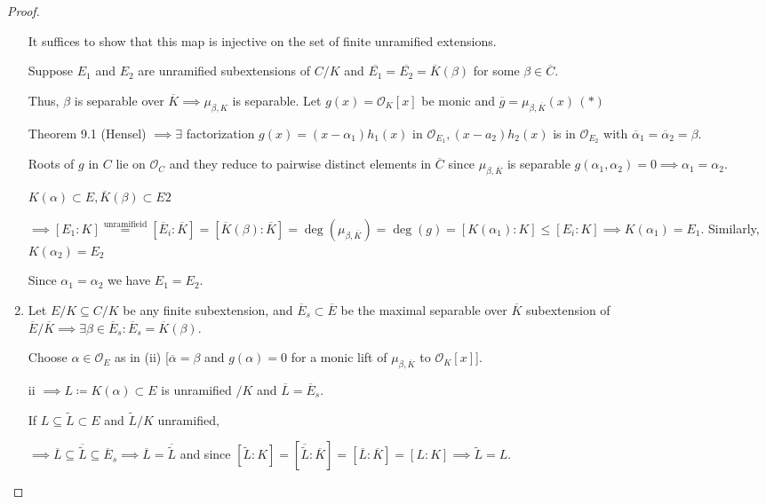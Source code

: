 \documentclass[openany]{amsbook}
\numberwithin{section}{chapter}
\theoremstyle{definition}
\begin{document}
\begin{proof}
\begin{enumerate}[label=\roman*)]
        It suffices to show that this map is injective on the set of finite unramified extensions.

        Suppose \(E_1\) and \(E_2\) are unramified subextensions of \(C / K\) and \(\overline{E_1} = \overline{E_2} = \overline{K}(\beta)\) for some \(\beta \in \overline{C}\).

        Thus, \(\beta\) is separable over \(\overline{K} \implies \mu_{\beta, K}\) is separable. Let \(g(x) = \mathcal{O}_K [x]\) be monic and \(\overline{g} = \mu_{\beta , \overline{K} }(x) \, (\ast)\) 

        Theorem 9.1 (Hensel) \(\implies \exists\) factorization \(g(x) = (x-\alpha_1)h_1(x)\) in \(\mathcal{O}_{E_1}, (x-a_2)h_2(x)\) is in \(\mathcal{O}_{E_2}\) with \(\overline{\alpha}_1 = \overline{\alpha}_2= \beta\).

        Roots of \(g\) in \(C\) lie on \(\mathcal{O}_C\) and they reduce to pairwise distinct elements in \(\overline{C}\) since \(\mu_{\beta , \overline{K}}\) is separable \(g(\alpha_1, \alpha_2) = 0 \implies \alpha_1 = \alpha_2  \).
        
        \(K(\alpha) \subset E, \overline{K}(\beta) \subset E2\)
        
        \(\implies [E_1 : K] \overset{\text{unramifieid}}{=} [\overline{E}_i : \overline{K}] = [\overline{K}(\beta): \overline{K} ] = \deg(\mu_{\beta , \overline{K}}) = \deg(g) = [K(\alpha_1):K] \leq [E_i:K] \implies K(\alpha_1) = E_1\). Similarly, \(K(\alpha_2) = E_2\) 
        
        Since \(\alpha_1 = \alpha_2\) we have  \(E_1 = E_2\).

        \item Let \(E / K \subseteq C / K\) be any finite subextension, and \(\overline{E}_s \subset \overline{E}\) be the maximal separable over \(\overline{K}\) subextension of \(\overline{E} / \overline{K} \implies \exists \beta \in \overline{E}_s : \overline{E}_s = \overline{K}(\beta)\).
        
        Choose \(\alpha \in \mathcal{O}_E\) as in (ii) [\(\overline{\alpha} = \beta\) and \(g(\alpha)=0\) for a monic lift of \(\mu_{\beta , \overline{K}}\) to \(\mathcal{O}_K[x]\)].

        ii \(\implies L\coloneqq K(\alpha) \subset E\) is unramified \(/ K\) and \(\overline{L} = \overline{E}_s\).

        If \(L \subseteq \widetilde{L} \subset E\) and \(\widetilde{L} / K\) unramified,

        \(\implies \overline{L} \subseteq \overline{\widetilde{L}} \subseteq \overline{E}_s \implies \overline{L} = \overline{\widetilde{L}}\) and since \([\widetilde{L} : K] = [\overline{\widetilde{L}} : \overline{K}] = [\overline{L} : \overline{K}] = [L:K] \implies \widetilde{L} = L\).


\end{enumerate}
\end{proof}
\end{document}
